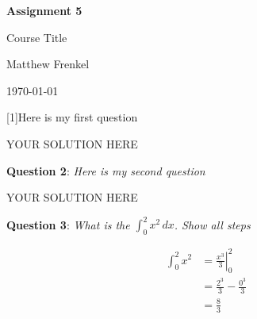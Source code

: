 \documentclass[11pt,a4paper]{article} %
\newcommand{\question}[2][]{\begin{flushleft}
        \textbf{Question #1}: \textit{#2}

\end{flushleft}}
\newcommand{\maketitletwo}[2][]{\begin{center}
        \Large{\textbf{Assignment #1}
            
            Course Title} %
        \vspace{5pt}
        
        \normalsize{Matthew Frenkel  %
        
        \today}        %
        \vspace{15pt}
        
\end{center}}
\begin{document}
    \maketitletwo[5]  %
    
    \question[1]{Here is my first question} 
    
    YOUR SOLUTION HERE
    
    \question[2]{Here is my second question}
    
    YOUR SOLUTION HERE
    
    \question[3]{What is the \Large{$\int_0^2 x^2 \, dx $}\normalsize{. Show all steps}}
    
    \begin{align*}
    \int_0^2 x^2 &= \left. \frac{x^3}{3} \right|_0^2 \\
                 &= \frac{2^3}{3}-\frac{0^3}{3}\\
                 &= \frac{8}{3}
    \end{align*}
\end{document}

